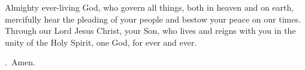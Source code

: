 \lettrine[lines=3]{A}{}lmighty ever-living God,
who govern all things,
both in heaven and on earth,
mercifully hear the pleading of your people
and bestow your peace on our times.
Through our Lord Jesus Christ, your Son,
who lives and reigns with you in the unity of the Holy Spirit,
one God, for ever and ever. \par \Rbar.~Amen.
